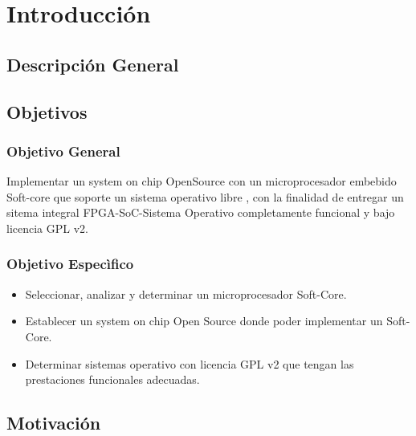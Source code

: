 \chapter{Introducción}


\section{Descripción General}



\section{Objetivos}
\subsection{Objetivo General}

Implementar un system on chip OpenSource con un microprocesador embebido
Soft-core que soporte un sistema operativo libre , con la finalidad de entregar
un sitema integral FPGA-SoC-Sistema Operativo completamente funcional y bajo licencia GPL v2.

\subsection{Objetivo Especìfico}
\begin{itemize}
\item Seleccionar, analizar y determinar un microprocesador Soft-Core.
\item Establecer un system on chip Open Source donde poder implementar un Soft-Core.
\item Determinar sistemas operativo con licencia GPL v2 que tengan las prestaciones funcionales adecuadas.
\end{itemize}

\section{Motivación} 

